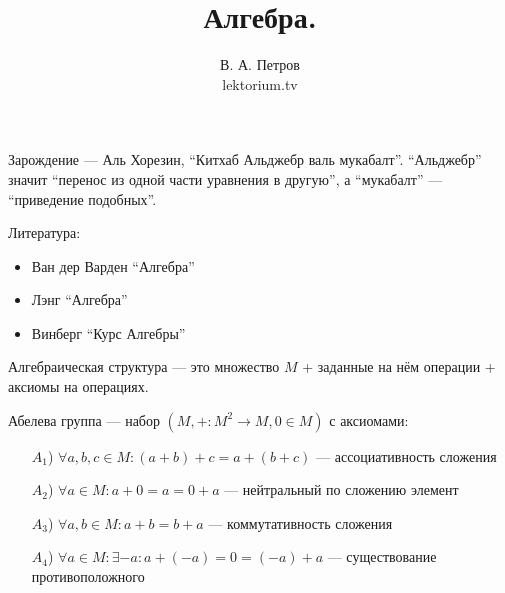 \documentclass[12pt,a4paper]{article}
\title{Алгебра.}
\author{В. А. Петров\\lektorium.tv}
\date{}
\begin{document}
    \maketitle

    Зарождение --- Аль Хорезин, ``Китхаб Альджебр валь мукабалт''. ``Альджебр'' значит ``перенос из одной части уравнения в другую'', а ``мукабалт'' --- ``приведение подобных''.

    Литература:
    \begin{itemize}
        \item Ван дер Варден ``Алгебра''
        \item Лэнг ``Алгебра''
        \item Винберг ``Курс Алгебры''
    \end{itemize}

    \begin{definition}
        Алгебраическая структура --- это множество $M$ + заданные на нём операции + аксиомы на операциях.
    \end{definition}

    \begin{definition}
        Абелева группа --- набор $(M, +: M^2 \to M, 0 \in M)$ с аксиомами:
        \begin{itemize}
            \item[$A_1$)] $\forall a, b, c \in M: (a + b) + c = a + (b + c)$ --- ассоциативность сложения
            \item[$A_2$)] $\forall a \in M: a + 0 = a = 0 + a$ --- нейтральный по сложению элемент
            \item[$A_3$)] $\forall a, b \in M: a + b = b + a$ --- коммутативность сложения
            \item[$A_4$)] $\forall a \in M: \exists -a: a + (-a) = 0 = (-a) + a$ --- существование противоположного
        \end{itemize}
    \end{definition}
\end{document}
